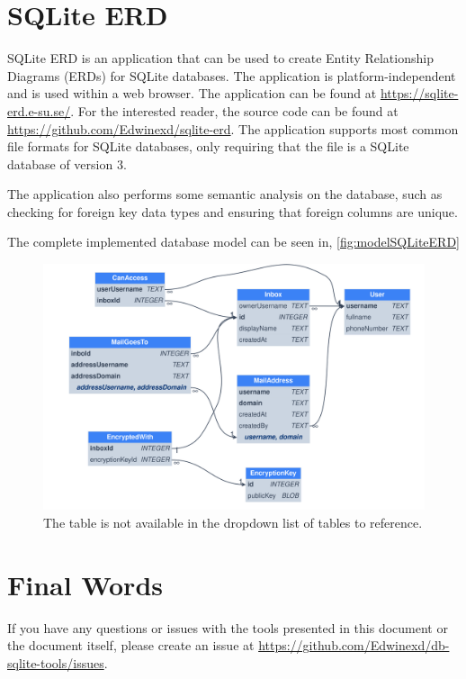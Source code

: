 \documentclass[a4paper,11pt,oneside]{article}
\begin{document}
\begin{sloppypar}
\section{SQLite ERD}
\label{sqliteERD}
SQLite ERD is an application that can be used to create Entity Relationship Diagrams (ERDs) for SQLite databases. The application is platform-independent and is used within a web browser. The application can be found at \url{https://sqlite-erd.e-su.se/}. For the interested reader, the source code can be found at \url{https://github.com/Edwinexd/sqlite-erd}.
The application supports most common file formats for SQLite databases, only requiring that the file is a SQLite database of version 3.

The application also performs some semantic analysis on the database, such as checking for foreign key data types and ensuring that foreign columns are unique.

The complete implemented database model can be seen in, \autoref{fig:modelSQLiteERD}

\begin{figure}[!htb]
  \centering
  \includegraphics[width=1\textwidth]{model/sqlite_erd.png}
  \caption{The table is not available in the dropdown list of tables to reference.}
  \label{fig:modelSQLiteERD}
\end{figure}

\section{Final Words}
\label{finalWords}
If you have any questions or issues with the tools presented in this document or the document itself, please create an issue at \url{https://github.com/Edwinexd/db-sqlite-tools/issues}.

\pagebreak



\end{sloppypar}
\end{document}
